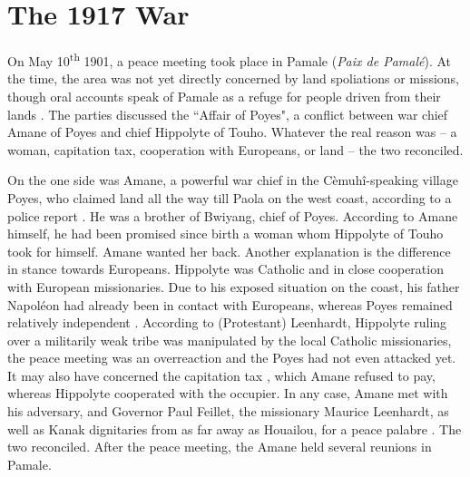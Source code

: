 
\section{The 1917 War}
On May 10\textsuperscript{th} 1901, a peace meeting took place in Pamale (\textit{Paix de Pamalé}). At the time, the area was not yet directly concerned by land spoliations or missions, though oral accounts speak of Pamale as a refuge for people driven from their lands \parencite[368, 369]{bensa_sanglots_2015}. The parties discussed the ``Affair of Poyes", a conflict between war chief Amane of Poyes and chief Hippolyte of Touho. Whatever the real reason was -- a woman, capitation tax, cooperation with Europeans, or land -- the two reconciled. 

On the one side was Amane, a powerful war chief in the Cèmuhî-speaking village Poyes, who claimed land all the way till Paola on the west coast, according to a police report \parencite[24]{leenhardt_figures_1978}. He was a brother of Bwiyang, chief of Poyes. According to Amane himself, he had been promised since birth a woman whom Hippolyte of Touho took for himself. Amane wanted her back. Another explanation is the difference in stance towards Europeans. Hippolyte was Catholic and in close cooperation with European missionaries. Due to his exposed situation on the coast, his father Napoléon had already been in contact with Europeans, whereas Poyes remained relatively independent \parencite[21]{leenhardt_evenements_1978a}. According to (Protestant) Leenhardt, Hippolyte ruling over a militarily weak tribe \parencite[28]{leenhardt_figures_1978} was manipulated by the local Catholic missionaries, the peace meeting was an overreaction and the Poyes had not even attacked yet. It may also have concerned the capitation tax \parencites[23]{leenhardt_figures_1978}[13]{philcat_revolte_1989}, which Amane refused to pay, whereas Hippolyte cooperated with the occupier. In any case, Amane met with his adversary, and Governor Paul Feillet, the missionary Maurice Leenhardt, as well as Kanak dignitaries from as far away as Houailou, for a peace palabre \textcite[24]{leenhardt_figures_1978}. The two reconciled. 
After the peace meeting, the  Amane held several reunions in Pamale. 

